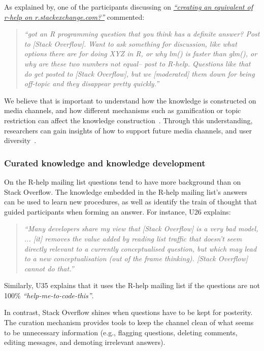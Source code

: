     As explained by, one of the participants discussing on \textit{\href{http://goo.gl/mTccwx}{``creating an equivalent of r-help on r.stackexchange.com?''}} commented:
    \begin{quote}
        \textit{``got an R programming question that you think has a definite answer? Post to [Stack Overflow]. Want to ask something for discussion, like what options there are for doing XYZ in R, or why lm() is faster than glm(), or why are these two numbers not equal-- post to R-help. Questions like that do get posted to [Stack Overflow], but we [moderated] them down for being off-topic and they disappear pretty quickly.''}
    \end{quote}

    We believe that is important to understand how the knowledge is constructed on media channels, and how different mechanisms such as gamification or topic restriction can affect the knowledge construction~\cite{Li2015}.
    Through this understanding, researchers can gain insights of how to support future media channels, and user diversity~\cite{Vasilescu2014b}.


    \subsubsection{Curated knowledge and knowledge development}

    On the R-help mailing list questions tend to have more background than on Stack Overflow.
    The knowledge embedded in the R-help mailing list's answers can be used to learn new procedures, as well as identify the train of thought that guided participants when forming an answer.
    For instance, U26 explains:
    \begin{quote}
        \textit{``Many developers share my view that [Stack Overflow] is a very bad model, ... [it] removes the value added by reading list traffic that doesn't seem directly relevant to a currently conceptualised question, but which may lead to a new conceptualisation (out of the frame thinking). [Stack Overflow] cannot do that.''}
    \end{quote}
    Similarly, U35 explains that it uses the R-help mailing list if the questions are not 100\% \textit{``help-me-to-code-this''}.

    In contrast, Stack Overflow shines when questions have to be kept for posterity. 
    The curation mechanism provides tools to keep the channel clean of what seems to be unnecessary information (e.g., flagging questions, deleting comments, editing messages, and demoting irrelevant answers).

